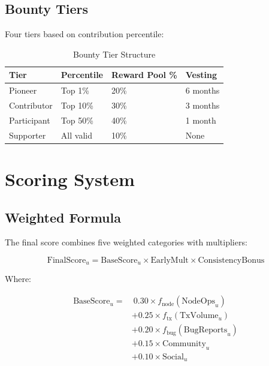 \documentclass[11pt,a4paper]{article}
\begin{document}
\subsection{Bounty Tiers}

Four tiers based on contribution percentile:

\begin{table}[h]
\centering
\begin{tabular}{|l|l|l|l|}
\hline
\textbf{Tier} & \textbf{Percentile} & \textbf{Reward Pool \%} & \textbf{Vesting} \\ \hline
Pioneer       & Top 1\%              & 20\%                     & 6 months         \\ \hline
Contributor   & Top 10\%             & 30\%                     & 3 months         \\ \hline
Participant   & Top 50\%             & 40\%                     & 1 month          \\ \hline
Supporter     & All valid            & 10\%                     & None             \\ \hline
\end{tabular}
\caption{Bounty Tier Structure}
\end{table}

\section{Scoring System}

\subsection{Weighted Formula}

The final score combines five weighted categories with multipliers:

\begin{equation}
\text{FinalScore}_u = \text{BaseScore}_u \times \text{EarlyMult} \times \text{ConsistencyBonus}
\end{equation}

Where:

\begin{equation}
\begin{split}
\text{BaseScore}_u = & \ 0.30 \times f_{\text{node}}(\text{NodeOps}_u) \\
                    & + 0.25 \times f_{\text{tx}}(\text{TxVolume}_u) \\
                    & + 0.20 \times f_{\text{bug}}(\text{BugReports}_u) \\
                    & + 0.15 \times \text{Community}_u \\
                    & + 0.10 \times \text{Social}_u
\end{split}
\end{equation}
\end{document}
